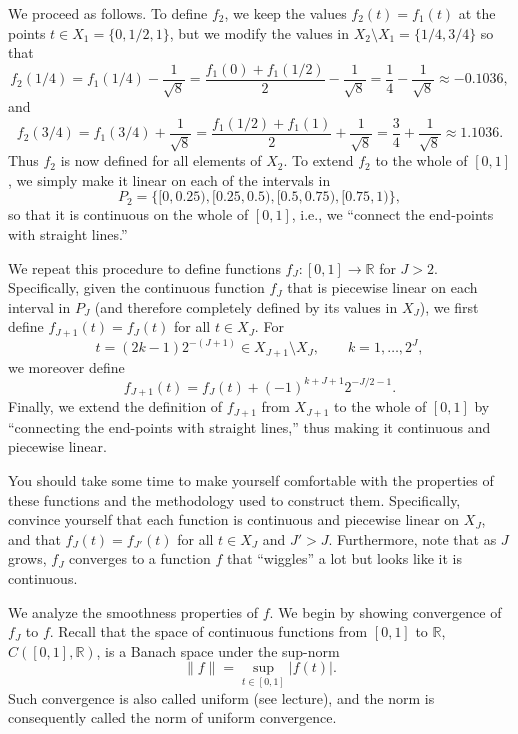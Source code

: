 \documentclass{article}
\begin{document}
We proceed as follows. To define $f_2$, we keep the values $f_2(t)=f_1(t)$ at the points $t\in X_1=\{0,1/2,1\}$, but we modify the values in $X_2\setminus X_1=\{1/4,3/4\}$ so that
\[
f_2(1/4)=f_1(1/4)-\frac{1}{\sqrt{8}}
=\frac{f_1(0)+f_1(1/2)}{2}-\frac{1}{\sqrt{8}}
=\frac14-\frac{1}{\sqrt{8}}\approx -0.1036,
\]
and
\[
f_2(3/4)=f_1(3/4)+\frac{1}{\sqrt{8}}
=\frac{f_1(1/2)+f_1(1)}{2}+\frac{1}{\sqrt{8}}
=\frac34+\frac{1}{\sqrt{8}}\approx 1.1036.
\]
Thus $f_2$ is now defined for all elements of $X_2$.
To extend $f_2$ to the whole of $[0,1]$, we simply make it linear on each of the intervals in
\[
P_2=\{[0,0.25),[0.25,0.5),[0.5,0.75),[0.75,1)\},
\]
so that it is continuous on the whole of $[0,1]$, i.e., we ``connect the end-points with straight lines.''

We repeat this procedure to define functions $f_J:[0,1]\to \mathbb{R}$ for $J>2$.
Specifically, given the continuous function $f_J$ that is piecewise linear on each interval in $P_J$ (and therefore completely defined by its values in $X_J$), we first define $f_{J+1}(t)=f_J(t)$ for all $t\in X_J$.
For
\[
t=(2k-1)2^{-(J+1)}\in X_{J+1}\setminus X_J,\qquad k=1,\ldots,2^J,
\]
we moreover define
\[
f_{J+1}(t)=f_J(t)+(-1)^{k+J+1}2^{-J/2-1}.
\]
Finally, we extend the definition of $f_{J+1}$ from $X_{J+1}$ to the whole of $[0,1]$ by ``connecting the end-points with straight lines,'' thus making it continuous and piecewise linear.

You should take some time to make yourself comfortable with the properties of these functions and the methodology used to construct them. Specifically, convince yourself that each function is continuous and piecewise linear on $X_J$, and that $f_J(t)=f_{J'}(t)$ for all $t\in X_J$ and $J'>J$.
Furthermore, note that as $J$ grows, $f_J$ converges to a function $f$ that ``wiggles'' a lot but looks like it is continuous.

We analyze the smoothness properties of $f$. We begin by showing convergence of $f_J$ to $f$.
Recall that the space of continuous functions from $[0,1]$ to $\mathbb{R}$, $C([0,1],\mathbb{R})$, is a Banach space under the sup-norm
\[
\|f\|=\sup_{t\in[0,1]}|f(t)|.
\]
Such convergence is also called uniform (see lecture), and the norm is consequently called the norm of uniform convergence.
\end{document}
